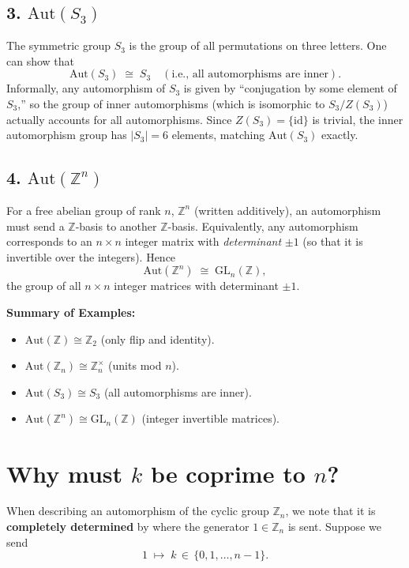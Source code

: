 \documentclass[12pt]{article}
\theoremstyle{definition} %
\theoremstyle{plain} %
\begin{document}
\subsection*{3. \texorpdfstring{$\mathrm{Aut}(S_3)$}{Aut(S\_3)}}

The symmetric group $S_3$ is the group of all permutations on three letters. 
One can show that 
\[
  \mathrm{Aut}(S_3) \;\cong\; S_3 \quad(\text{i.e., all automorphisms are inner}).
\]
Informally, any automorphism of $S_3$ is given by ``conjugation by some element of $S_3$,'' 
so the group of inner automorphisms (which is isomorphic to $S_3/Z(S_3)$) 
actually accounts for all automorphisms. 
Since $Z(S_3) = \{\mathrm{id}\}$ is trivial, 
the inner automorphism group has $|S_3|=6$ elements, matching $\mathrm{Aut}(S_3)$ exactly.

\subsection*{4. \texorpdfstring{$\mathrm{Aut}(\mathbb{Z}^n)$}{Aut(Z^n)}}

For a free abelian group of rank $n$, $\mathbb{Z}^n$ (written additively),
an automorphism must send a $\mathbb{Z}$-basis to another $\mathbb{Z}$-basis. 
Equivalently, any automorphism corresponds to an $n \times n$ integer matrix 
with \emph{determinant} $\pm 1$ (so that it is invertible over the integers). Hence
\[
  \mathrm{Aut}(\mathbb{Z}^n) \;\cong\; \mathrm{GL}_n(\mathbb{Z}),
\]
the group of all $n \times n$ integer matrices with determinant $\pm 1$.

\bigskip

\noindent \textbf{Summary of Examples:}
\begin{itemize}
\item $\mathrm{Aut}(\mathbb{Z}) \cong \mathbb{Z}_2$ (only flip and identity).
\item $\mathrm{Aut}(\mathbb{Z}_n) \cong \mathbb{Z}_n^\times$ (units mod $n$).
\item $\mathrm{Aut}(S_3) \cong S_3$ (all automorphisms are inner).
\item $\mathrm{Aut}(\mathbb{Z}^n) \cong \mathrm{GL}_n(\mathbb{Z})$ (integer invertible matrices).
\end{itemize}
\section*{Why must \texorpdfstring{$k$}{k} be coprime to \texorpdfstring{$n$}{n}?}

When describing an automorphism of the cyclic group $\mathbb{Z}_n$, we note that it is
\textbf{completely determined} by where the generator $1 \in \mathbb{Z}_n$ is sent. Suppose we send
\[
  1 \;\mapsto\; k \,\in\, \{0,1,\dots,n-1\}.
\]
\end{document}

